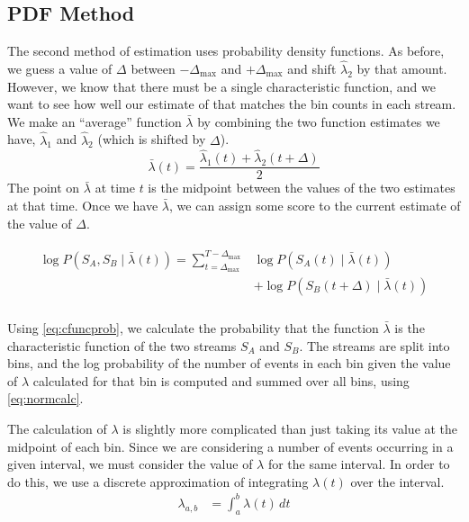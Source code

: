 \documentclass[a4paper,11pt]{article}
\begin{document}
\subsection{PDF Method}
\label{sec-4-2}

   The second method of estimation uses probability density functions. As
   before, we guess a value of $\Delta$ between $-\Delta_{\text{max}}$ and
   $+\Delta_{\text{max}}$ and shift $\hat{\lambda}_2$ by that amount. However,
   we know that there must be a single characteristic function, and we want to
   see how well our estimate of that matches the bin counts in each stream. We
   make an ``average'' function $\bar{\lambda}$ by combining the two function
   estimates we have, $\hat{\lambda}_1$ and $\hat{\lambda}_2$ (which is shifted
   by $\Delta$).
   \begin{equation}
   \bar{\lambda}(t)=\frac{\hat{\lambda}_1(t)+\hat{\lambda}_2(t+\Delta)}{2}
   \end{equation}
   The point on $\bar{\lambda}$ at time $t$ is the midpoint between the values of
   the two estimates at that time. Once we have $\bar{\lambda}$, we can assign some
   score to the current estimate of the value of $\Delta$.

   \begin{align}
   \begin{split}
   \log P(S_A,S_B\mid\bar{\lambda}(t))=\sum_{t=\Delta_{\text{max}}}^{T-\Delta_{\text{max}}}&\log P(S_A(t)\mid \bar{\lambda}(t))\\
   &+ \log P(S_B(t+\Delta)\mid \bar{\lambda}(t))\\
   \label{eq:cfuncprob}
   \end{split}
   \end{align}
   
   Using \eqref{eq:cfuncprob}, we calculate the probability that the function $\bar{\lambda}$ is the
   characteristic function of the two streams $S_A$ and $S_B$. The streams are
   split into bins, and the log probability of the number of events in each bin
   given the value of $\lambda$ calculated for that bin is computed and summed
   over all bins, using \eqref{eq:normcalc}.

   The calculation of $\lambda$ is slightly more complicated than just taking
   its value at the midpoint of each bin. Since we are considering a number of
   events occurring in a given interval, we must consider the value of $\lambda$
   for the same interval. In order to do this, we use a discrete approximation
   of integrating $\lambda(t)$ over the interval.
   \begin{align}
   \lambda_{a,b}&=\int_a^b\lambda(t)\,dt
   \end{align}
\end{document}
